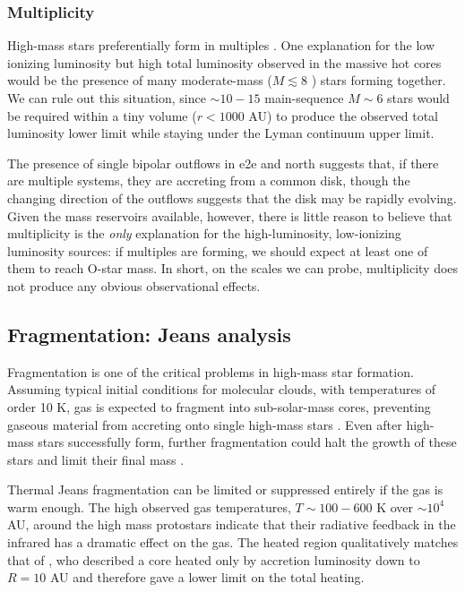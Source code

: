 \documentclass{emulateapj}
\begin{document}
\subsubsection{Multiplicity}
High-mass stars preferentially form in multiples \citep{Zinnecker2007a}.  One
explanation for the low ionizing luminosity but high total luminosity observed
in the massive hot cores would be the presence of many moderate-mass
($M\lesssim8$ \msun) stars forming together.  We can rule out this situation,
since $\sim10-15$ main-sequence $M\sim6$ \msun stars would be required within a
tiny volume ($r<1000$ AU) to produce the observed total luminosity lower limit
while staying under the Lyman continuum upper limit.

The presence of single bipolar outflows in e2e and north suggests that, if
there are multiple systems, they are accreting from a common disk, though the
changing direction of the outflows suggests that the disk may be rapidly
evolving.  Given the mass reservoirs available, however, there is little reason
to believe that multiplicity is the \emph{only} explanation for the
high-luminosity, low-ionizing luminosity sources: if multiples are forming, we
should expect at least one of them to reach O-star mass.  In short, on the
scales we can probe, multiplicity does not produce any obvious observational
effects.



\subsection{Fragmentation: Jeans analysis}
\label{sec:fragmentation}
Fragmentation is one of the critical problems in high-mass star formation.
Assuming typical initial conditions for molecular clouds, with temperatures of
order 10 K, gas is expected to fragment into sub-solar-mass cores, preventing gaseous
material from accreting onto single high-mass stars \citep{Krumholz2015a}.
Even after high-mass stars successfully form, further fragmentation could
halt the growth of these stars and limit their final mass \citep{Peters2010a}.

Thermal Jeans fragmentation can be limited or suppressed entirely if the gas is
warm enough.  The high observed gas temperatures, $T\sim100-600$ K over
$\sim10^4$ AU, around the high mass protostars indicate that their radiative
feedback in the infrared has a dramatic effect on the gas.  The heated region
qualitatively matches that of \citet{Krumholz2006a}, who described
a core heated only by accretion luminosity down to $R=10$ AU and therefore
gave a lower limit on the total heating. 
\end{document}
